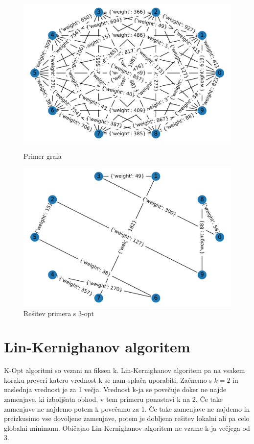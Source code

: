 \documentclass[12pt, a4paper]{article}
\begin{document}
\begin{figure}[!h]
    
    \begin{minipage}{0.5\textwidth}
    \includegraphics[width=8 cm]{primeri/primer2.png}
    \caption{Primer grafa}
    \label{primer_3_opt}
  \end{minipage}
 \hspace{1cm}
  \begin{minipage}{0.5\textwidth}
    \includegraphics[width=8 cm]{primeri/primer2_3opt.png}
    \caption{Rešitev primera s 3-opt}
    \label{resitev_3_opt}
  \end{minipage}
    
\end{figure}




\newpage
\section[Lin-Kernighanov algoritem]{Lin-Kernighanov algoritem}
K-Opt algoritmi so vezani na fiksen k. Lin-Kernighanov algoritem pa na vsakem koraku preveri katero vrednost k se nam splača uporabiti. Začnemo s $k=2$ in naslednja vrednost je za 1 večja. Vrednost k-ja se povečuje doker ne najde zamenjave, ki izboljšata obhod, v tem primeru ponastavi  k na 2. Če take zamenjave ne najdemo potem k povečamo za 1. Če take zamenjave ne najdemo in preizkusimo vse dovoljene zamenjave, potem je dobljena rešitev lokalni ali pa celo globalni minimum.  Običajno Lin-Kernighanov algoritem ne vzame k-ja večjega od 3.\\
\end{document}
